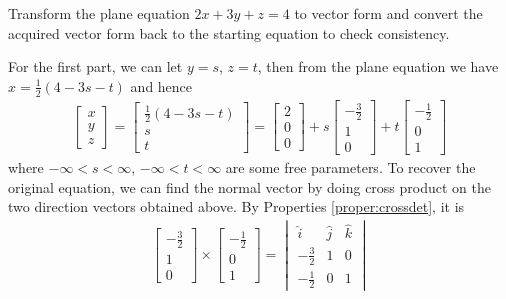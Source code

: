\begin{exmp}
Transform the plane equation $2x+3y+z = 4$ to vector form and convert the acquired vector form back to the starting equation to check consistency.
\end{exmp}
\begin{solution}
For the first part, we can let $y=s$, $z=t$, then from the plane equation we have $x = \frac{1}{2}(4-3s-t)$ and hence
\begin{align*}
\begin{bmatrix}
x \\
y \\
z
\end{bmatrix}
=
\begin{bmatrix}
\frac{1}{2}(4-3s-t) \\
s \\
t
\end{bmatrix}
=
\begin{bmatrix}
2 \\
0 \\
0
\end{bmatrix}
+ s
\begin{bmatrix}
-\frac{3}{2} \\
1 \\
0
\end{bmatrix}
+ t
\begin{bmatrix}
-\frac{1}{2} \\
0 \\
1
\end{bmatrix}
\end{align*}
where $-\infty < s < \infty$, $-\infty < t < \infty$ are some free parameters. To recover the original equation, we can find the normal vector by doing cross product on the two direction vectors obtained above. By Properties \ref{proper:crossdet}, it is
\begin{align*}
\begin{bmatrix}
-\frac{3}{2} \\
1 \\
0
\end{bmatrix}
\times
\begin{bmatrix}
-\frac{1}{2} \\
0 \\
1
\end{bmatrix}
=
\begin{vmatrix}
\hat{i} & \hat{j} & \hat{k} \\
-\frac{3}{2} & 1 & 0 \\
-\frac{1}{2} & 0 & 1
\end{vmatrix}

\end{align*}
\end{solution}
